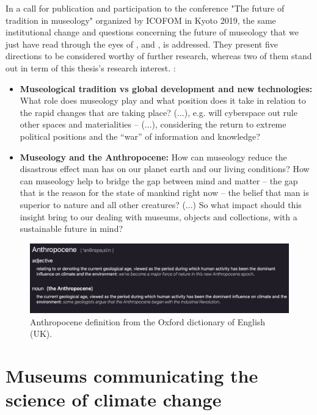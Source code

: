 In a call for publication and participation to the conference "The future of tradition in museology" organized by ICOFOM in Kyoto 2019, the same institutional change and questions concerning the future of museology that we just have read through the eyes of \autocite{ross_interpreting_2015}, \autocite{vergo_museology_1989} and \autocite{vermeeren_museum_2018}, is addressed. They present five directions to be considered worthy of further research, whereas two of them stand out in term of this thesis's research interest. \autocite[p. 4]{icofom_kyoto_2019}:

\begin{itemize}
    \item \textbf{Museological tradition vs global development and new technologies:} What role does museology play and what position does it take in relation to the rapid changes that are taking place? (...), e.g. will cyberspace out rule other spaces and materialities – (...), considering the return to extreme political positions and the “war” of information and knowledge?
    \item \textbf{Museology and the Anthropocene:} How can museology reduce the disastrous effect man has on our planet earth and our living conditions? How can museology help to bridge the gap between mind and matter – the gap that is the reason for the state of mankind right now – the belief that man is superior to nature and all other creatures? (...) So what impact should this insight bring to our dealing with museums, objects and collections, with a sustainable future in mind?
\end{itemize}

\begin{figure}[H]
\includegraphics[width=12.5cm]{pictures/background/anthropocene.png}
\caption{Anthropocene definition from the Oxford dictionary of English (UK).}
\centering
\end{figure}

\section{Museums communicating the science of climate change}

